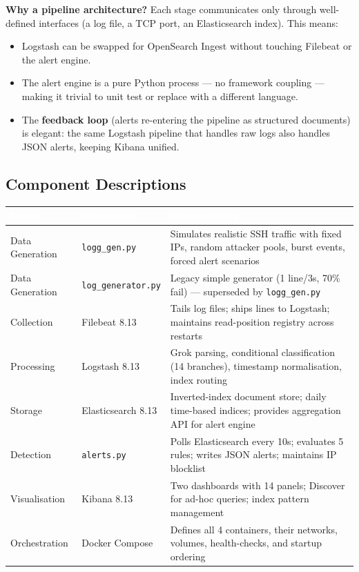 \documentclass[12pt,a4paper]{article}
\newcommand{\file}[1]{\texttt{\color{accent}#1}}
\begin{document}
\textbf{Why a pipeline architecture?} Each stage communicates only through
well-defined interfaces (a log file, a TCP port, an Elasticsearch index). This
means:
\begin{itemize}[leftmargin=2em,topsep=2pt]
  \item Logstash can be swapped for OpenSearch Ingest without touching
        Filebeat or the alert engine.
  \item The alert engine is a pure Python process — no framework coupling —
        making it trivial to unit test or replace with a different language.
  \item The \textbf{feedback loop} (alerts re-entering the pipeline as
        structured documents) is elegant: the same Logstash pipeline that
        handles raw logs also handles JSON alerts, keeping Kibana unified.
\end{itemize}

\subsection{Component Descriptions}

\begin{center}
\begin{tabular}{|p{3.2cm}|p{2.8cm}|p{7.5cm}|}
  \hline
  \rowcolor{tabhead}
  \textcolor{white}{\textbf{Layer}} &
  \textcolor{white}{\textbf{Component}} &
  \textcolor{white}{\textbf{Responsibility}} \\
  \hline
  Data Generation   & \file{logg\_gen.py}   & Simulates realistic SSH traffic with fixed IPs, random attacker pools, burst events, forced alert scenarios \\
  \hline
  \rowcolor{rowalt}
  Data Generation   & \file{log\_generator.py} & Legacy simple generator (1 line/3s, 70\% fail) — superseded by \file{logg\_gen.py} \\
  \hline
  Collection        & Filebeat 8.13         & Tails log files; ships lines to Logstash; maintains read-position registry across restarts \\
  \hline
  \rowcolor{rowalt}
  Processing        & Logstash 8.13         & Grok parsing, conditional classification (14 branches), timestamp normalisation, index routing \\
  \hline
  Storage           & Elasticsearch 8.13    & Inverted-index document store; daily time-based indices; provides aggregation API for alert engine \\
  \hline
  \rowcolor{rowalt}
  Detection         & \file{alerts.py}      & Polls Elasticsearch every 10s; evaluates 5 rules; writes JSON alerts; maintains IP blocklist \\
  \hline
  Visualisation     & Kibana 8.13           & Two dashboards with 14 panels; Discover for ad-hoc queries; index pattern management \\
  \hline
  Orchestration     & Docker Compose        & Defines all 4 containers, their networks, volumes, health-checks, and startup ordering \\
  \hline
\end{tabular}
\end{center}
\end{document}
